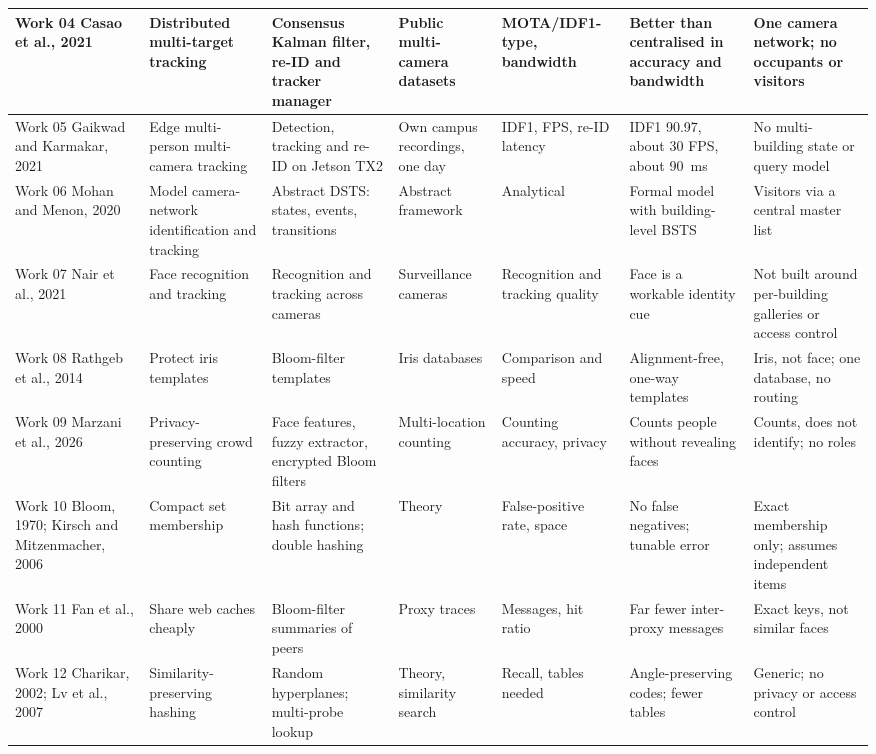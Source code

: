 \documentclass[12pt,a4paper,oneside]{report}
\begin{document}
\begin{landscape}
\begin{longtable}{|p{2.2cm}|p{2.6cm}|p{3.5cm}|p{2.7cm}|p{3.0cm}|p{2.9cm}|p{3.3cm}|}
Work 04 \cite{ref4} Casao et al., 2021 & Distributed multi-target tracking & Consensus Kalman filter, re-ID and tracker manager & Public multi-camera datasets & MOTA/IDF1-type, bandwidth & Better than centralised in accuracy and bandwidth & One camera network; no occupants or visitors\\\hline
Work 05 \cite{ref5} Gaikwad and Karmakar, 2021 & Edge multi-person multi-camera tracking & Detection, tracking and re-ID on Jetson TX2 & Own campus recordings, one day & IDF1, FPS, re-ID latency & IDF1 90.97, about 30 FPS, about 90~ms & No multi-building state or query model\\\hline
Work 06 \cite{ref6} Mohan and Menon, 2020 & Model camera-network identification and tracking & Abstract DSTS: states, events, transitions & Abstract framework & Analytical & Formal model with building-level BSTS & Visitors via a central master list\\\hline
Work 07 \cite{ref8} Nair et al., 2021 & Face recognition and tracking & Recognition and tracking across cameras & Surveillance cameras & Recognition and tracking quality & Face is a workable identity cue & Not built around per-building galleries or access control\\\hline
Work 08 \cite{ref10} Rathgeb et al., 2014 & Protect iris templates & Bloom-filter templates & Iris databases & Comparison and speed & Alignment-free, one-way templates & Iris, not face; one database, no routing\\\hline
Work 09 \cite{ref11} Marzani et al., 2026 & Privacy-preserving crowd counting & Face features, fuzzy extractor, encrypted Bloom filters & Multi-location counting & Counting accuracy, privacy & Counts people without revealing faces & Counts, does not identify; no roles\\\hline
Work 10 \cite{ref12,ref16} Bloom, 1970; Kirsch and Mitzenmacher, 2006 & Compact set membership & Bit array and hash functions; double hashing & Theory & False-positive rate, space & No false negatives; tunable error & Exact membership only; assumes independent items\\\hline
Work 11 \cite{ref13} Fan et al., 2000 & Share web caches cheaply & Bloom-filter summaries of peers & Proxy traces & Messages, hit ratio & Far fewer inter-proxy messages & Exact keys, not similar faces\\\hline
Work 12 \cite{ref14,ref15} Charikar, 2002; Lv et al., 2007 & Similarity-preserving hashing & Random hyperplanes; multi-probe lookup & Theory, similarity search & Recall, tables needed & Angle-preserving codes; fewer tables & Generic; no privacy or access control\\\hline
\end{longtable}\endgroup
\end{landscape}
\clearpage
\end{document}
